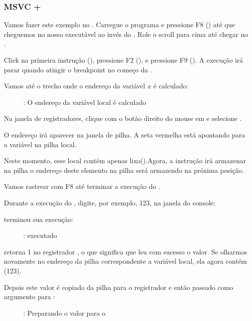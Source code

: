 \clearpage
\subsubsection{MSVC + \olly}
\myindex{\olly}

Vamos fazer este exemplo no \olly.
Carregue o programa e pressione F8 (\stepover) até que cheguemos no nosso executável ao invés do .
Role o scroll para cima até chegar no \main.

Click na primeira instrução (), pressione F2 (), e pressione F9 ().
A execução irá parar quando atingir o breakpoint no começo da \main.

Vamos até o trecho onde o endereço da variável $x$ é calculado:


\begin{figure}[H]
\centering
{}
\caption{\olly: O endereço da variável local é calculado}
\label{fig:scanf_ex1_olly_1}
\end{figure}

Na janela de registradores, clique com o botão direito do mouse em \EAX e selecione .

O endereço irá aparecer na janela de pilha.
A seta vermelha está apontando para a variável na pilha local.

Neste momento, esse local contém apenas lixo().Agora,  a instrução \PUSH irá armazenar na pilha o endereço deste elemento na pilha será armazendo na próxima posição.

Vamos rastrear com F8 até terminar a execução do \scanf.

Durante a execução do \scanf, digite, por exemplo, 123, na janela do console:



\clearpage
\scanf terminou sua execução:

\begin{figure}[H]
\centering
{}
\caption{\olly: \scanf executado}
\label{fig:scanf_ex1_olly_3}
\end{figure}

\scanf retorna 1 no registrador \EAX, o que significa que leu com sucesso o valor.
Se olharmos novamente no endereço da pilha correspondente a variável local, ela agora contém  (123).

\clearpage

Depois este valor é copiado da pilha para o registrador \ECX e então passado como argumento para \printf:


\begin{figure}[H]
\centering
{}
\caption{\olly: Preparando o valor para o \printf}
\label{fig:scanf_ex1_olly_4}
\end{figure}
